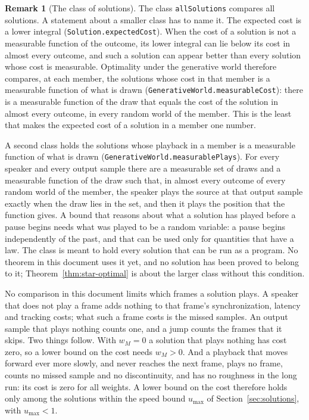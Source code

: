 \documentclass[11pt,a4paper]{article}
\newcommand{\lean}[1]{\texttt{#1}}
\theoremstyle{definition}
\newtheorem{remark}[definition]{Remark}
\begin{document}
\begin{remark}[The class of solutions]
The class \lean{allSolutions} compares all solutions. A statement about a
smaller class has to name it. The expected cost is a lower integral
(\lean{Solution.\allowbreak expectedCost}). When the cost of a solution is
not a measurable function of the outcome, its lower integral can lie below
its cost in almost every outcome, and such a solution can appear better than
every solution whose cost is measurable. Optimality under the generative
world therefore compares, at each member, the solutions whose cost in that
member is a measurable function of what is drawn
(\lean{GenerativeWorld.\allowbreak measurableCost}): there is a measurable
function of the draw that equals the cost of the solution in almost every
outcome, in every random world of the member. This is the least that makes
the expected cost of a solution in a member one number.

A second class holds the solutions whose playback in a member is a
measurable function of what is drawn
(\lean{GenerativeWorld.\allowbreak measurablePlays}). For every speaker and
every output sample there are a measurable set of draws and a measurable
function of the draw such that, in almost every outcome of every random
world of the member, the speaker plays the source at that output sample
exactly when the draw lies in the set, and then it plays the position that
the function gives. A bound that reasons about what a solution has played
before a pause begins needs what was played to be a random variable: a pause
begins independently of the past, and that can be used only for quantities
that have a law. The class is meant to hold every solution that can be run
as a program. No theorem in this document uses it yet, and no solution has
been proved to belong to it; Theorem~\ref{thm:star-optimal} is about the
larger class without this condition.

No comparison in this document limits which frames a solution plays. A
speaker that does not play a frame adds nothing to that frame's
synchronization, latency and tracking costs; what such a frame costs is the
missed samples. An output sample that plays nothing counts one, and a jump
counts the frames that it skips. Two things follow. With $w_M = 0$ a
solution that plays nothing has cost zero, so a lower bound on the cost
needs $w_M > 0$. And a playback that moves forward ever more slowly, and
never reaches the next frame, plays no frame, counts no missed sample and no
discontinuity, and has no roughness in the long run: its cost is zero for
all weights. A lower bound on the cost therefore holds only among the
solutions within the speed bound $u_{\max}$ of
Section~\ref{sec:solutions}, with $u_{\max} < 1$.
\end{remark}
\end{document}
